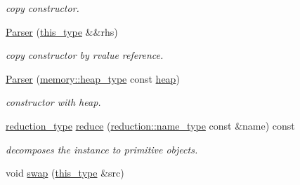 \begin{DoxyCompactItemize}
\begin{DoxyCompactList}\small\item\em copy constructor. \end{DoxyCompactList}\item 
\hypertarget{classhryky_1_1http_1_1header_1_1_parser_aa1e2013e7432d276cb491ab1c83f4485}{\hyperlink{classhryky_1_1http_1_1header_1_1_parser_aa1e2013e7432d276cb491ab1c83f4485}{Parser} (\hyperlink{classhryky_1_1http_1_1header_1_1_parser_aed496466ed39c1bcf709a3be673f3478}{this\-\_\-type} \&\&rhs)}\label{classhryky_1_1http_1_1header_1_1_parser_aa1e2013e7432d276cb491ab1c83f4485}

\begin{DoxyCompactList}\small\item\em copy constructor by rvalue reference. \end{DoxyCompactList}\item 
\hypertarget{classhryky_1_1http_1_1header_1_1_parser_af05ea7da6b61854b2d9e85a5f91e381b}{\hyperlink{classhryky_1_1http_1_1header_1_1_parser_af05ea7da6b61854b2d9e85a5f91e381b}{Parser} (\hyperlink{classhryky_1_1memory_1_1heap_1_1_base}{memory\-::heap\-\_\-type} const \hyperlink{classhryky_1_1parser_1_1_base_ade0723cedb648d9850423cc04fe4bdcf}{heap})}\label{classhryky_1_1http_1_1header_1_1_parser_af05ea7da6b61854b2d9e85a5f91e381b}

\begin{DoxyCompactList}\small\item\em constructor with heap. \end{DoxyCompactList}\item 
\hypertarget{classhryky_1_1http_1_1header_1_1_parser_a4ac02c5b2de84a6e8130148dc6064bb8}{\hyperlink{namespacehryky_a343a9a4c36a586be5c2693156200eadc}{reduction\-\_\-type} \hyperlink{classhryky_1_1http_1_1header_1_1_parser_a4ac02c5b2de84a6e8130148dc6064bb8}{reduce} (\hyperlink{namespacehryky_1_1reduction_ac686c30a4c8d196bbd0f05629a6b921f}{reduction\-::name\-\_\-type} const \&name) const }\label{classhryky_1_1http_1_1header_1_1_parser_a4ac02c5b2de84a6e8130148dc6064bb8}

\begin{DoxyCompactList}\small\item\em decomposes the instance to primitive objects. \end{DoxyCompactList}\item 
\hypertarget{classhryky_1_1parser_1_1_base_ab2b137d16fbe40d839ee136bd5304cab}{void \hyperlink{classhryky_1_1parser_1_1_base_ab2b137d16fbe40d839ee136bd5304cab}{swap} (\hyperlink{classhryky_1_1http_1_1header_1_1_parser_aed496466ed39c1bcf709a3be673f3478}{this\-\_\-type} \&src)}\label{classhryky_1_1parser_1_1_base_ab2b137d16fbe40d839ee136bd5304cab}


\end{DoxyCompactItemize}
